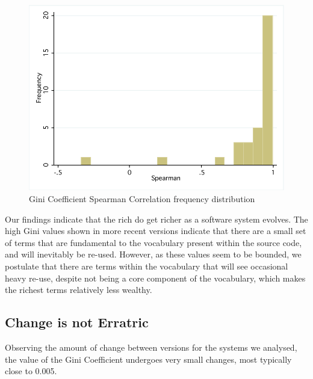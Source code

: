 \begin{figure}[t]
\centering
\includegraphics[width=\textwidth]{Figures/Vocab-GiniSpearmanFreqDist.pdf}
\caption{Gini Coefficient Spearman Correlation frequency distribution}
\label{fig:vocab-gini-spearman}
\end{figure}

Our findings indicate that the rich do get richer as a software system evolves. The high Gini values shown in more recent versions indicate that there are a small set of terms that are fundamental to the vocabulary present within the source code, and will inevitably be re-used. However, as these values seem to be bounded, we postulate that there are terms within the vocabulary that will see occasional heavy re-use, despite not being a core component of the vocabulary, which makes the richest terms relatively less wealthy.


\subsection{Change is not Erratric} %
\label{sub:change_is_not_erratric}


Observing the amount of change between versions for the systems we analysed, the value of the Gini Coefficient undergoes very small changes, most typically close to 0.005.


